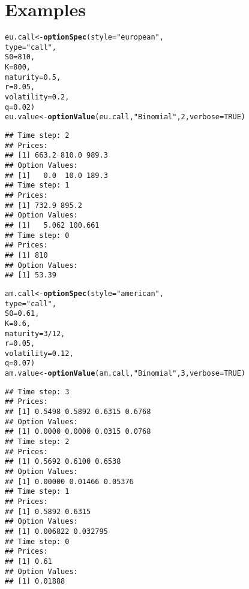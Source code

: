 \documentclass{article}\usepackage[]{graphicx}\usepackage[]{color}
\makeatletter
\newcommand{\hlstr}[1]{\textcolor[rgb]{0.192,0.494,0.8}{#1}}%
\newcommand{\hlkwd}[1]{\textcolor[rgb]{0.737,0.353,0.396}{\textbf{#1}}}%
\newenvironment{kframe}{%
 \def\at@end@of@kframe{}%
 \ifinner\ifhmode%
  \def\at@end@of@kframe{\end{minipage}}%
  \begin{minipage}{\columnwidth}%
 \fi\fi%
 \def\FrameCommand##1{\hskip\@totalleftmargin \hskip-\fboxsep
 \colorbox{shadecolor}{##1}\hskip-\fboxsep
     \hskip-\linewidth \hskip-\@totalleftmargin \hskip\columnwidth}%
 \MakeFramed {\advance\hsize-\width
   \@totalleftmargin\z@ \linewidth\hsize
   \@setminipage}}%
 {\par\unskip\endMakeFramed%
 \at@end@of@kframe}
\newenvironment{knitrout}{}{} %
\makeatother
\begin{document}
\section{Examples}
\begin{knitrout}
\color{fgcolor}\begin{kframe}
\begin{alltt}
eu.call <- \hlkwd{optionSpec}(style = \hlstr{"european"}, 
                      type = \hlstr{"call"}, 
                      S0 = 810, 
                      K = 800, 
                      maturity = 0.5, 
                      r = 0.05, 
                      volatility = 0.2,
                      q = 0.02)
eu.value <- \hlkwd{optionValue}(eu.call, \hlstr{"Binomial"}, 2, verbose = TRUE)
\end{alltt}
\begin{verbatim}
## Time step: 2
## Prices:
## [1] 663.2 810.0 989.3
## Option Values:
## [1]   0.0  10.0 189.3
## Time step: 1
## Prices:
## [1] 732.9 895.2
## Option Values:
## [1]   5.062 100.661
## Time step: 0
## Prices:
## [1] 810
## Option Values:
## [1] 53.39
\end{verbatim}
\end{kframe}
\end{knitrout}



\begin{knitrout}
\color{fgcolor}\begin{kframe}
\begin{alltt}
am.call <- \hlkwd{optionSpec}(style = \hlstr{"american"}, 
                      type = \hlstr{"call"}, 
                      S0 = 0.61, 
                      K = 0.6, 
                      maturity = 3/12, 
                      r = 0.05, 
                      volatility = 0.12,
                      q = 0.07)
am.value <- \hlkwd{optionValue}(am.call, \hlstr{"Binomial"}, 3, verbose = TRUE)
\end{alltt}
\begin{verbatim}
## Time step: 3
## Prices:
## [1] 0.5498 0.5892 0.6315 0.6768
## Option Values:
## [1] 0.0000 0.0000 0.0315 0.0768
## Time step: 2
## Prices:
## [1] 0.5692 0.6100 0.6538
## Option Values:
## [1] 0.00000 0.01466 0.05376
## Time step: 1
## Prices:
## [1] 0.5892 0.6315
## Option Values:
## [1] 0.006822 0.032795
## Time step: 0
## Prices:
## [1] 0.61
## Option Values:
## [1] 0.01888
\end{verbatim}
\end{kframe}
\end{knitrout}



\end{document}
